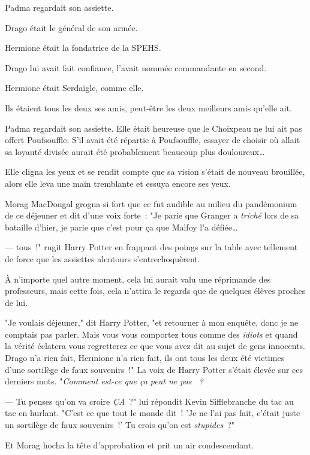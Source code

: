 \later

Padma regardait son assiette.

Drago était le général de son armée.

Hermione était la fondatrice de la SPEHS.

Drago lui avait fait confiance, l'avait nommée commandante en second.

Hermione était Serdaigle, comme elle.

Ils étaient tous les deux ses amis, peut-être les deux meilleurs amis qu'elle ait.

Padma regardait son assiette. Elle était heureuse que le Choixpeau ne lui ait pas offert Poufsouffle. S'il avait été répartie à Poufsouffle, essayer de choisir où allait sa loyauté divisée aurait été probablement beaucoup plus douloureux…

Elle cligna les yeux et se rendit compte que sa vision s'était de nouveau brouillée, alors elle leva une main tremblante et essuya encore ses yeux.

Morag MacDougal grogna si fort que ce fut audible au milieu du pandémonium de ce déjeuner et dit d'une voix forte~: "Je parie que Granger a \emph{triché} lors de sa bataille d'hier, je parie que c'est pour ça que Malfoy l'a défiée…

---  tous~!" rugit Harry Potter en frappant des poings sur la table avec tellement de force que les assiettes alentours s'entrechoquèrent.

À n'importe quel autre moment, cela lui aurait valu une réprimande des professeurs, mais cette fois, cela n'attira le regards que de quelques élèves proches de lui.

"Je voulais déjeuner," dit Harry Potter, "et retourner à mon enquête, donc je ne comptais pas parler. Mais vous vous comportez tous comme des \emph{idiots} et quand la vérité éclatera vous regretterez ce que vous avez dit au sujet de gens innocents. Drago n'a rien fait, Hermione n'a rien fait, ils ont tous les deux été victimes d'une sortilège de faux souvenirs~!" La voix de Harry Potter s'était élevée sur ces derniers mots. "\emph{Comment est-ce que ça peut ne pas ~?}

--- Tu penses qu'on va croire \emph{ÇA}~?" lui répondit Kevin Sifflebranche du tac au tac en hurlant. "C'est ce que tout le monde dit~! 'Je ne l'ai pas fait, c'était juste un sortilège de faux souvenirs~!' Tu crois qu'on est \emph{stupides}~?"

Et Morag hocha la tête d'approbation et prit un air condescendant.

